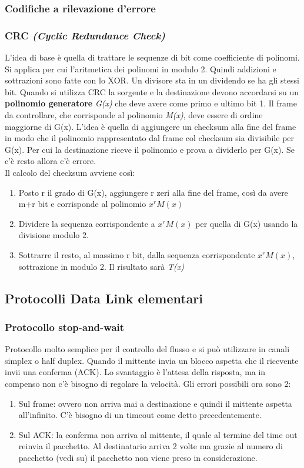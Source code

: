 \subsubsection{Codifiche a rilevazione d'errore}
\subsubsection*{CRC \textit{(Cyclic Redundance Check)}}
L'idea di base è quella di trattare le sequenze di bit come coefficiente di polinomi. Si applica per cui l'aritmetica dei polinomi in modulo 2. Quindi addizioni e sottrazioni sono fatte con lo XOR. Un divisore sta in un dividendo se ha gli stessi bit. Quando si utilizza CRC la sorgente e la destinazione devono accordarsi su un \textbf{polinomio generatore} \textit{G(x)} che deve avere come primo e ultimo bit 1. Il frame da controllare, che corrisponde al polinomio \textit{M(x)}, deve essere di ordine maggiorne di G(x). L'idea è quella di aggiungere un checksum alla fine del frame in modo che il polinomio rappresentato dal frame col checksum sia divisibile per G(x). Per cui la destinazione riceve il polinomio e prova a dividerlo per G(x). Se c'è resto allora c'è errore.\\
Il calcolo del checksum avviene così:
\begin{enumerate}
\item{Posto r il grado di G(x), aggiungere r zeri alla fine del frame, così da avere m+r bit e corrisponde al polinomio \( x^r M(x)\)}
\item{Dividere la sequenza corrispondente a \( x^r M(x)\) per quella di G(x) usando la divisione modulo 2.}
\item{Sottrarre il resto, al massimo r bit, dalla sequenza corrispondente \( x^r M(x)\), sottrazione in modulo 2. Il risultato sarà \textit{T(x)}}
\end{enumerate}

\subsection{Protocolli Data Link elementari}
\subsubsection{Protocollo stop-and-wait}
Protocollo molto semplice per il controllo del flusso e si può utilizzare in canali simplex o half duplex. Quando il mittente invia un blocco aspetta che il ricevente invii una conferma (ACK). Lo svantaggio è l'attesa della risposta, ma in compenso non c'è bisogno di regolare la velocità. Gli errori possibili ora sono 2:
\begin{enumerate}
\item{Sul frame: ovvero non arriva mai a destinazione e quindi il mittente aspetta all'infinito. C'è bisogno di un timeout come detto precedentemente.}
\item{Sul ACK: la conferma non arriva al mittente, il quale al termine del time out reinvia il pacchetto. Al destinatario arriva 2 volte ma grazie al numero di pacchetto (vedi su) il pacchetto non viene preso in considerazione.}
\end{enumerate}
